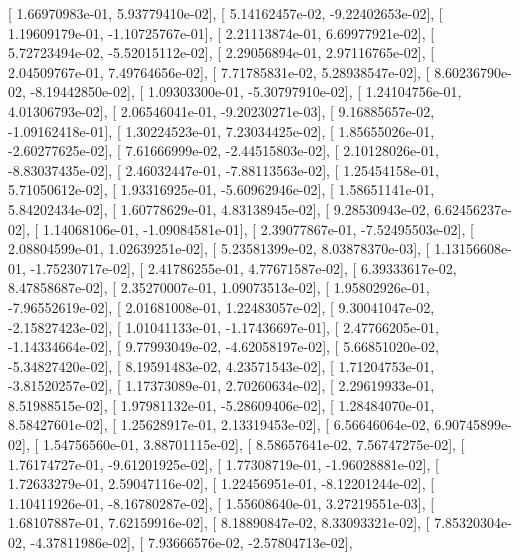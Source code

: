\documentclass{article}
\begin{document}
       [  1.66970983e-01,   5.93779410e-02],
       [  5.14162457e-02,  -9.22402653e-02],
       [  1.19609179e-01,  -1.10725767e-01],
       [  2.21113874e-01,   6.69977921e-02],
       [  5.72723494e-02,  -5.52015112e-02],
       [  2.29056894e-01,   2.97116765e-02],
       [  2.04509767e-01,   7.49764656e-02],
       [  7.71785831e-02,   5.28938547e-02],
       [  8.60236790e-02,  -8.19442850e-02],
       [  1.09303300e-01,  -5.30797910e-02],
       [  1.24104756e-01,   4.01306793e-02],
       [  2.06546041e-01,  -9.20230271e-03],
       [  9.16885657e-02,  -1.09162418e-01],
       [  1.30224523e-01,   7.23034425e-02],
       [  1.85655026e-01,  -2.60277625e-02],
       [  7.61666999e-02,  -2.44515803e-02],
       [  2.10128026e-01,  -8.83037435e-02],
       [  2.46032447e-01,  -7.88113563e-02],
       [  1.25454158e-01,   5.71050612e-02],
       [  1.93316925e-01,  -5.60962946e-02],
       [  1.58651141e-01,   5.84202434e-02],
       [  1.60778629e-01,   4.83138945e-02],
       [  9.28530943e-02,   6.62456237e-02],
       [  1.14068106e-01,  -1.09084581e-01],
       [  2.39077867e-01,  -7.52495503e-02],
       [  2.08804599e-01,   1.02639251e-02],
       [  5.23581399e-02,   8.03878370e-03],
       [  1.13156608e-01,  -1.75230717e-02],
       [  2.41786255e-01,   4.77671587e-02],
       [  6.39333617e-02,   8.47858687e-02],
       [  2.35270007e-01,   1.09073513e-02],
       [  1.95802926e-01,  -7.96552619e-02],
       [  2.01681008e-01,   1.22483057e-02],
       [  9.30041047e-02,  -2.15827423e-02],
       [  1.01041133e-01,  -1.17436697e-01],
       [  2.47766205e-01,  -1.14334664e-02],
       [  9.77993049e-02,  -4.62058197e-02],
       [  5.66851020e-02,  -5.34827420e-02],
       [  8.19591483e-02,   4.23571543e-02],
       [  1.71204753e-01,  -3.81520257e-02],
       [  1.17373089e-01,   2.70260634e-02],
       [  2.29619933e-01,   8.51988515e-02],
       [  1.97981132e-01,  -5.28609406e-02],
       [  1.28484070e-01,   8.58427601e-02],
       [  1.25628917e-01,   2.13319453e-02],
       [  6.56646064e-02,   6.90745899e-02],
       [  1.54756560e-01,   3.88701115e-02],
       [  8.58657641e-02,   7.56747275e-02],
       [  1.76174727e-01,  -9.61201925e-02],
       [  1.77308719e-01,  -1.96028881e-02],
       [  1.72633279e-01,   2.59047116e-02],
       [  1.22456951e-01,  -8.12201244e-02],
       [  1.10411926e-01,  -8.16780287e-02],
       [  1.55608640e-01,   3.27219551e-03],
       [  1.68107887e-01,   7.62159916e-02],
       [  8.18890847e-02,   8.33093321e-02],
       [  7.85320304e-02,  -4.37811986e-02],
       [  7.93666576e-02,  -2.57804713e-02],
\end{document}
